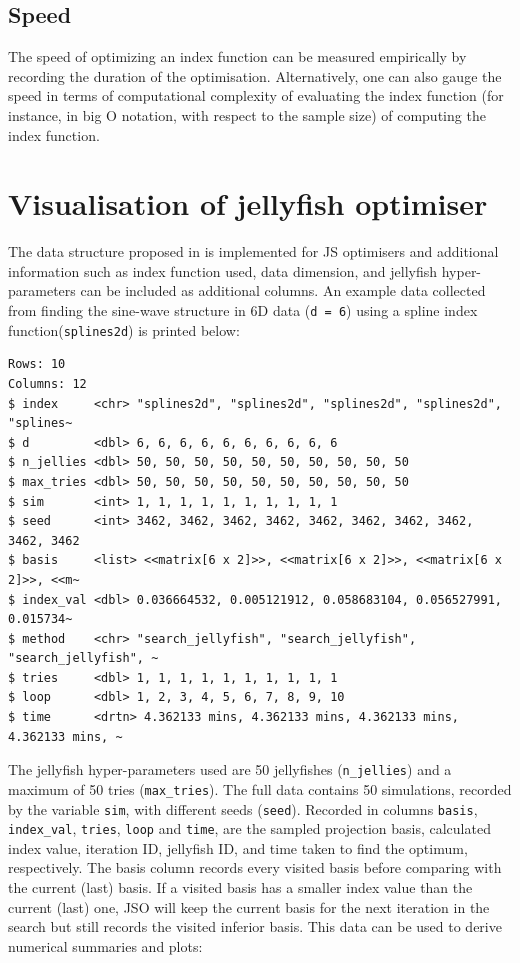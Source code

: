 \documentclass[
  number,
  preprint,
  3p]{elsarticle}
\begin{document}
\hypertarget{speed}{%
\subsection{Speed}\label{speed}}

The speed of optimizing an index function can be measured empirically by
recording the duration of the optimisation. Alternatively, one can also
gauge the speed in terms of computational complexity of evaluating the
index function (for instance, in big O notation, with respect to the
sample size) of computing the index function.

\hypertarget{sec-vis}{%
\section{Visualisation of jellyfish optimiser}\label{sec-vis}}

The data structure proposed in \citet{RJ-2021-105} is implemented for JS
optimisers and additional information such as index function used, data
dimension, and jellyfish hyper-parameters can be included as additional
columns. An example data collected from finding the sine-wave structure
in 6D data (\texttt{d\ =\ 6}) using a spline index
function(\texttt{splines2d}) is printed below:

\begin{verbatim}
Rows: 10
Columns: 12
$ index     <chr> "splines2d", "splines2d", "splines2d", "splines2d", "splines~
$ d         <dbl> 6, 6, 6, 6, 6, 6, 6, 6, 6, 6
$ n_jellies <dbl> 50, 50, 50, 50, 50, 50, 50, 50, 50, 50
$ max_tries <dbl> 50, 50, 50, 50, 50, 50, 50, 50, 50, 50
$ sim       <int> 1, 1, 1, 1, 1, 1, 1, 1, 1, 1
$ seed      <int> 3462, 3462, 3462, 3462, 3462, 3462, 3462, 3462, 3462, 3462
$ basis     <list> <<matrix[6 x 2]>>, <<matrix[6 x 2]>>, <<matrix[6 x 2]>>, <<m~
$ index_val <dbl> 0.036664532, 0.005121912, 0.058683104, 0.056527991, 0.015734~
$ method    <chr> "search_jellyfish", "search_jellyfish", "search_jellyfish", ~
$ tries     <dbl> 1, 1, 1, 1, 1, 1, 1, 1, 1, 1
$ loop      <dbl> 1, 2, 3, 4, 5, 6, 7, 8, 9, 10
$ time      <drtn> 4.362133 mins, 4.362133 mins, 4.362133 mins, 4.362133 mins, ~
\end{verbatim}

The jellyfish hyper-parameters used are 50 jellyfishes
(\texttt{n\_jellies}) and a maximum of 50 tries (\texttt{max\_tries}).
The full data contains 50 simulations, recorded by the variable
\texttt{sim}, with different seeds (\texttt{seed}). Recorded in columns
\texttt{basis}, \texttt{index\_val}, \texttt{tries}, \texttt{loop} and
\texttt{time}, are the sampled projection basis, calculated index value,
iteration ID, jellyfish ID, and time taken to find the optimum,
respectively. The basis column records every visited basis before
comparing with the current (last) basis. If a visited basis has a
smaller index value than the current (last) one, JSO will keep the
current basis for the next iteration in the search but still records the
visited inferior basis. This data can be used to derive numerical
summaries and plots:
\end{document}
